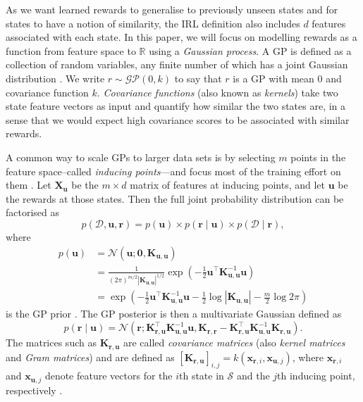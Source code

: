 \documentclass{mpaper}
\newcommand{\Kuu}{\mathbf{K}_{\mathbf{u},\mathbf{u}}}
\newcommand{\Krr}{\mathbf{K}_{\mathbf{r},\mathbf{r}}}
\newcommand{\Kru}{\mathbf{K}_{\mathbf{r},\mathbf{u}}}
\newcommand{\pfull}{p(\mathcal{D}, \mathbf{u}, \mathbf{r})}
\begin{document}
As we want learned rewards to generalise to previously unseen states and
for states to have a notion of similarity, the IRL definition also includes $d$
features associated with each state. In this paper, we will focus on modelling
rewards as a function from feature space to $\mathbb{R}$ using a \emph{Gaussian
  process}. A GP is defined as a collection of random variables, any finite
number of which has a joint Gaussian distribution
\cite{DBLP:books/lib/RasmussenW06}. We write $r \sim \mathcal{GP}(0, k)$ to say
that $r$ is a GP with mean $0$ and covariance function $k$. \emph{Covariance
  functions} (also known as \emph{kernels}) take two state feature vectors as
input and quantify how similar the two states are, in a sense that we would
expect high covariance scores to be associated with similar rewards.

A common way to scale GPs to larger data sets is by selecting $m$ points in the
feature space--called \emph{inducing points}---and focus most of the training
effort on them \cite{DBLP:journals/corr/abs-1807-01065}. Let $\mathbf{X_u}$ be
the $m \times d$ matrix of features at inducing points, and let $\mathbf{u}$ be
the rewards at those states. Then the full joint probability distribution can be
factorised as
\begin{equation} \label{eq:full}
  \pfull = p(\mathbf{u}) \times p(\mathbf{r} \mid \mathbf{u}) \times
  p(\mathcal{D} \mid \mathbf{r}),
\end{equation}
where
\begin{align*}
  p(\mathbf{u}) &= \mathcal{N}(\mathbf{u}; \mathbf{0}, \Kuu) \\
                &= \frac{1}{(2\pi)^{m/2}|\Kuu|^{1/2}}\exp \left( -\frac{1}{2} \mathbf{u}^\intercal\Kuu^{-1}\mathbf{u} \right) \\
                &= \exp\left(-\frac{1}{2}\mathbf{u}^\intercal\Kuu^{-1}\mathbf{u} - \frac{1}{2}\log|\Kuu| - \frac{m}{2}\log 2\pi\right)
\end{align*}
is the GP prior \cite{DBLP:books/lib/RasmussenW06}. The GP posterior is then a
multivariate Gaussian \cite{DBLP:conf/nips/LevinePK11} defined as
\begin{equation} \label{eq:r}
  p(\mathbf{r} \mid \mathbf{u}) =
  \mathcal{N}(\mathbf{r}; \Kru^\intercal\Kuu^{-1}\mathbf{u}, \Krr - \Kru^\intercal\Kuu^{-1}\Kru).
\end{equation}
The matrices such as
$\Kru$ are called \emph{covariance matrices} (also \emph{kernel matrices} and
\emph{Gram matrices}) and are defined as
$[\Kru]_{i,j} = k(\mathbf{x}_{\mathbf{r},i},
\mathbf{x}_{\mathbf{u},j})$, where $\mathbf{x}_{\mathbf{r},i}$ and
$\mathbf{x}_{\mathbf{u},j}$ denote feature vectors for the $i$th state in
$\mathcal{S}$ and the $j$th inducing point, respectively
\cite{DBLP:conf/uai/JinDAS17}.
\end{document}
